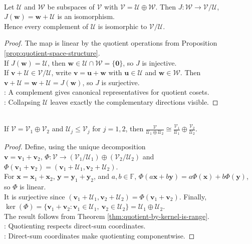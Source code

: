 \begin{proposition} \label{prop:quotient-by-complement-is-complement} \\
Let $\mathcal{U}$ and $\mathcal{W}$ be subspaces of $\mathcal{V}$ with $\mathcal{V}=\mathcal{U}\oplus\mathcal{W}$. Then $J:\mathcal{W}\to\mathcal{V}/\mathcal{U}$, $J(\mathbf{w})=\mathbf{w}+\mathcal{U}$ is an isomorphism.\\
Hence every complement of $\mathcal{U}$ is isomorphic to $\mathcal{V}/\mathcal{U}$.
\begin{proof}
The map is linear by the quotient operations from Proposition \ref{prop:quotient-space-structure}.\\
If $J(\mathbf{w})=\mathcal{U}$, then $\mathbf{w}\in\mathcal{U}\cap\mathcal{W}=\{\mathbf{0}\}$, so $J$ is injective.\\
If $\mathbf{v}+\mathcal{U}\in\mathcal{V}/\mathcal{U}$, write $\mathbf{v}=\mathbf{u}+\mathbf{w}$ with $\mathbf{u}\in\mathcal{U}$ and $\mathbf{w}\in\mathcal{W}$. Then $\mathbf{v}+\mathcal{U}=\mathbf{w}+\mathcal{U}=J(\mathbf{w})$, so $J$ is surjective.\\
: A complement gives canonical representatives for quotient cosets.\\
: Collapsing $\mathcal{U}$ leaves exactly the complementary directions visible.
\end{proof}
\end{proposition}

\begin{proposition} \label{prop:quotient-of-direct-sum-by-direct-sum} \\
If $\mathcal{V}=\mathcal{V}_1\oplus\mathcal{V}_2$ and $\mathcal{U}_j\leq\mathcal{V}_j$ for $j=1,2$, then $\frac{\mathcal{V}}{\mathcal{U}_1\oplus\mathcal{U}_2} \cong \frac{\mathcal{V}_1}{\mathcal{U}_1}\oplus \frac{\mathcal{V}_2}{\mathcal{U}_2}$.
\begin{proof}
Define, using the unique decomposition\\
$\mathbf{v}=\mathbf{v}_1+\mathbf{v}_2$,
$\Phi:\mathcal{V}\to (\mathcal{V}_1/\mathcal{U}_1)\oplus(\mathcal{V}_2/\mathcal{U}_2)$ and $\Phi(\mathbf{v}_1+\mathbf{v}_2) =(\mathbf{v}_1+\mathcal{U}_1,\mathbf{v}_2+\mathcal{U}_2)$.\\
For $\mathbf{x}=\mathbf{x}_1+\mathbf{x}_2$, $\mathbf{y}=\mathbf{y}_1+\mathbf{y}_2$, and $a,b\in\mathbb{F}$, $\Phi(a\mathbf{x}+b\mathbf{y}) =a\Phi(\mathbf{x})+b\Phi(\mathbf{y})$, so $\Phi$ is linear.\\
It is surjective since $(\mathbf{v}_1+\mathcal{U}_1,\mathbf{v}_2+\mathcal{U}_2)=\Phi(\mathbf{v}_1+\mathbf{v}_2)$. Finally, $\ker(\Phi)=\{\mathbf{v}_1+\mathbf{v}_2:\mathbf{v}_1\in\mathcal{U}_1,\ \mathbf{v}_2\in\mathcal{U}_2\} =\mathcal{U}_1\oplus\mathcal{U}_2$.\\
The result follows from Theorem \ref{thm:quotient-by-kernel-is-range}.\\
: Quotienting respects direct-sum coordinates.\\
: Direct-sum coordinates make quotienting componentwise.
\end{proof}
\end{proposition}

